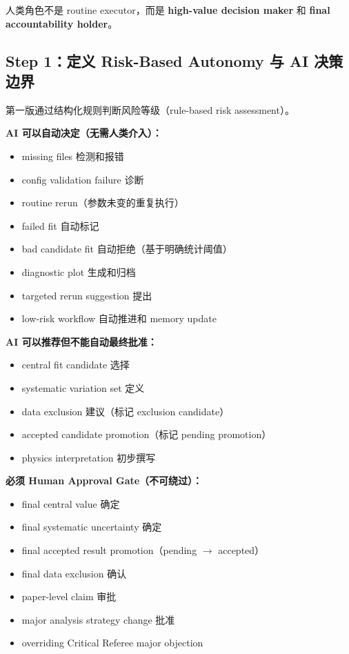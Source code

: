 \documentclass[11pt,a4paper,fontset=none]{ctexart}
\begin{document}
人类角色不是 routine executor，而是 \textbf{high-value decision maker} 和 \textbf{final accountability holder}。

\subsection{Step 1：定义 Risk-Based Autonomy 与 AI 决策边界}

第一版通过结构化规则判断风险等级（rule-based risk assessment）。

\textbf{AI 可以自动决定（无需人类介入）：}
\begin{itemize}[leftmargin=2em]
  \item missing files 检测和报错
  \item config validation failure 诊断
  \item routine rerun（参数未变的重复执行）
  \item failed fit 自动标记
  \item bad candidate fit 自动拒绝（基于明确统计阈值）
  \item diagnostic plot 生成和归档
  \item targeted rerun suggestion 提出
  \item low-risk workflow 自动推进和 memory update
\end{itemize}

\textbf{AI 可以推荐但不能自动最终批准：}
\begin{itemize}[leftmargin=2em]
  \item central fit candidate 选择
  \item systematic variation set 定义
  \item data exclusion 建议（标记 exclusion candidate）
  \item accepted candidate promotion（标记 pending promotion）
  \item physics interpretation 初步撰写
\end{itemize}

\textbf{必须 Human Approval Gate（不可绕过）：}
\begin{itemize}[leftmargin=2em]
  \item final central value 确定
  \item final systematic uncertainty 确定
  \item final accepted result promotion（pending $\to$ accepted）
  \item final data exclusion 确认
  \item paper-level claim 审批
  \item major analysis strategy change 批准
  \item overriding Critical Referee major objection
\end{itemize}
\end{document}
